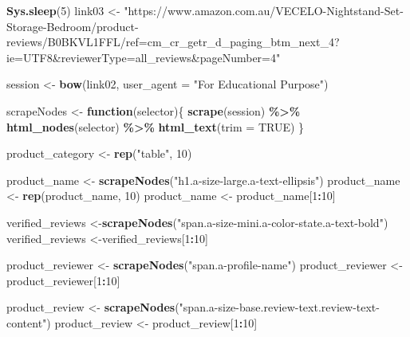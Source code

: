 \documentclass[
]{article}
\newenvironment{Shaded}{\begin{snugshade}}{\end{snugshade}}
\newcommand{\AttributeTok}[1]{\textcolor[rgb]{0.13,0.29,0.53}{#1}}
\newcommand{\ConstantTok}[1]{\textcolor[rgb]{0.56,0.35,0.01}{#1}}
\newcommand{\ControlFlowTok}[1]{\textcolor[rgb]{0.13,0.29,0.53}{\textbf{#1}}}
\newcommand{\DecValTok}[1]{\textcolor[rgb]{0.00,0.00,0.81}{#1}}
\newcommand{\FunctionTok}[1]{\textcolor[rgb]{0.13,0.29,0.53}{\textbf{#1}}}
\newcommand{\NormalTok}[1]{#1}
\newcommand{\OtherTok}[1]{\textcolor[rgb]{0.56,0.35,0.01}{#1}}
\newcommand{\SpecialCharTok}[1]{\textcolor[rgb]{0.81,0.36,0.00}{\textbf{#1}}}
\newcommand{\StringTok}[1]{\textcolor[rgb]{0.31,0.60,0.02}{#1}}
\begin{document}
\begin{Shaded}
\begin{Highlighting}[]
   \FunctionTok{Sys.sleep}\NormalTok{(}\DecValTok{5}\NormalTok{)}
\NormalTok{link03 }\OtherTok{\textless{}{-}} \StringTok{"https://www.amazon.com.au/VECELO{-}Nightstand{-}Set{-}Storage{-}Bedroom/product{-}reviews/B0BKVL1FFL/ref=cm\_cr\_getr\_d\_paging\_btm\_next\_4?ie=UTF8\&reviewerType=all\_reviews\&pageNumber=4"}


\NormalTok{  session }\OtherTok{\textless{}{-}} \FunctionTok{bow}\NormalTok{(link02,}
               \AttributeTok{user\_agent =} \StringTok{"For Educational Purpose"}\NormalTok{)}

\NormalTok{  scrapeNodes }\OtherTok{\textless{}{-}} \ControlFlowTok{function}\NormalTok{(selector)\{}
    \FunctionTok{scrape}\NormalTok{(session) }\SpecialCharTok{\%\textgreater{}\%}
      \FunctionTok{html\_nodes}\NormalTok{(selector) }\SpecialCharTok{\%\textgreater{}\%}
      \FunctionTok{html\_text}\NormalTok{(}\AttributeTok{trim =} \ConstantTok{TRUE}\NormalTok{)}
\NormalTok{  \}}

\NormalTok{  product\_category }\OtherTok{\textless{}{-}} \FunctionTok{rep}\NormalTok{(}\StringTok{"table"}\NormalTok{, }\DecValTok{10}\NormalTok{)}

\NormalTok{  product\_name }\OtherTok{\textless{}{-}} \FunctionTok{scrapeNodes}\NormalTok{(}\StringTok{"h1.a{-}size{-}large.a{-}text{-}ellipsis"}\NormalTok{)}
\NormalTok{  product\_name }\OtherTok{\textless{}{-}} \FunctionTok{rep}\NormalTok{(product\_name, }\DecValTok{10}\NormalTok{)}
\NormalTok{  product\_name }\OtherTok{\textless{}{-}}\NormalTok{ product\_name[}\DecValTok{1}\SpecialCharTok{:}\DecValTok{10}\NormalTok{]}
  
\NormalTok{  verified\_reviews }\OtherTok{\textless{}{-}}\FunctionTok{scrapeNodes}\NormalTok{(}\StringTok{"span.a{-}size{-}mini.a{-}color{-}state.a{-}text{-}bold"}\NormalTok{)}
\NormalTok{  verified\_reviews }\OtherTok{\textless{}{-}}\NormalTok{verified\_reviews[}\DecValTok{1}\SpecialCharTok{:}\DecValTok{10}\NormalTok{]}
  
\NormalTok{  product\_reviewer }\OtherTok{\textless{}{-}} \FunctionTok{scrapeNodes}\NormalTok{(}\StringTok{"span.a{-}profile{-}name"}\NormalTok{)}
\NormalTok{  product\_reviewer }\OtherTok{\textless{}{-}}\NormalTok{ product\_reviewer[}\DecValTok{1}\SpecialCharTok{:}\DecValTok{10}\NormalTok{]}
  
\NormalTok{  product\_review }\OtherTok{\textless{}{-}} \FunctionTok{scrapeNodes}\NormalTok{(}\StringTok{"span.a{-}size{-}base.review{-}text.review{-}text{-}content"}\NormalTok{)}
\NormalTok{  product\_review }\OtherTok{\textless{}{-}}\NormalTok{ product\_review[}\DecValTok{1}\SpecialCharTok{:}\DecValTok{10}\NormalTok{]}
  

\end{Highlighting}
\end{Shaded}
\end{document}
